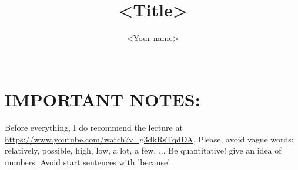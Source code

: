 \documentclass{libs/sig-alternate}
\begin{document}
\title{<Title>}

\author{
\alignauthor
	<Your name>\\
    \\
}


\maketitle


\section*{IMPORTANT NOTES:}
Before everything, I do recommend the lecture at \url{https://www.youtube.com/watch?v=g3dkRsTqdDA}. Please, avoid vague words: relatively, possible, high, low, a lot, a few, ... Be quantitative! give an idea of numbers. Avoid start sentences with 'because'. 
	








\newpage

\end{document}
